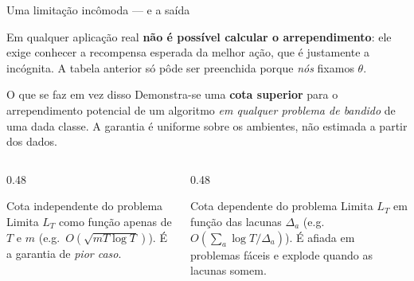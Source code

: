 \documentclass[aspectratio=169, 10pt]{beamer}
\newcommand{\gap}{\Delta}
\newcommand{\Reg}{L}
\begin{document}
\begin{frame}{Uma limitação incômoda --- e a saída}
  \begin{alertabox}
    Em qualquer aplicação real \textbf{não é possível calcular o
    arrependimento}: ele exige conhecer a recompensa esperada da melhor
    ação, que é justamente a incógnita. A tabela anterior só pôde ser
    preenchida porque \emph{nós} fixamos $\theta$.
  \end{alertabox}

  \begin{defbox}{O que se faz em vez disso}
    Demonstra-se uma \textbf{cota superior} para o arrependimento potencial
    de um algoritmo \emph{em qualquer problema de bandido} de uma dada
    classe. A garantia é uniforme sobre os ambientes, não estimada a
    partir dos dados.
  \end{defbox}

  \begin{columns}[T]
    \begin{column}{0.48\textwidth}
      \begin{defbox}{Cota independente do problema}
        Limita $\Reg_T$ como função apenas de $T$ e $m$
        (e.g.\ $O(\sqrt{mT\log T})$). É a garantia de \emph{pior caso}.
      \end{defbox}
    \end{column}
    \begin{column}{0.48\textwidth}
      \begin{defbox}{Cota dependente do problema}
        Limita $\Reg_T$ em função das lacunas $\gap_a$
        (e.g.\ $O(\sum_a \log T / \gap_a)$). É afiada em problemas fáceis
        e explode quando as lacunas somem.
      \end{defbox}
    \end{column}
  \end{columns}
\end{frame}
\end{document}
